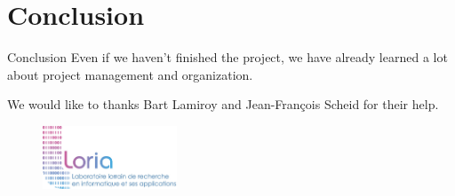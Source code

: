 \documentclass[c]{beamer}
\begin{document}
\section{Conclusion}
\begin{frame}
  \begin{block}{Conclusion}
   Even if we haven’t finished the project, we have already learned a lot about project management and organization.

   We would like to thanks Bart Lamiroy and Jean-François Scheid for their help.
  \end{block}
  \begin{figure}
    \includegraphics[width=4cm]{loria}
  \end{figure}
\end{frame}
\end{document}
